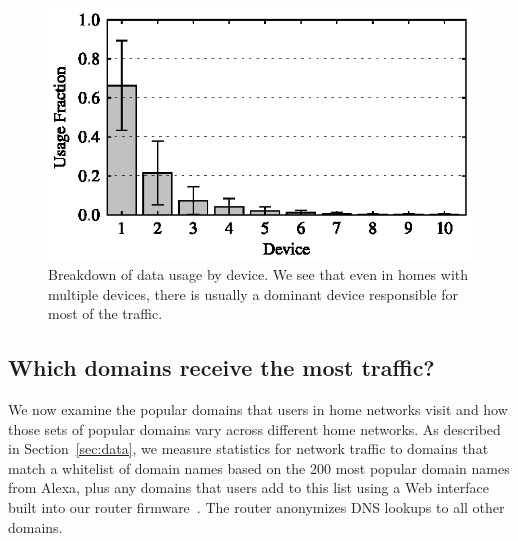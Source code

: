 \begin{figure}[t]
  \begin{minipage}{\linewidth}
  \includegraphics[width=0.98\linewidth]{figures/deviceUtil}
  \caption{Breakdown of data usage by device. We see that even
   in homes with multiple devices, there is usually a dominant
   device responsible for most of the traffic.}
  \label{fig:passive-device-frac}
  \end{minipage}
\end{figure}

\subsection{Which domains receive the most traffic?}\label{sec:popular-domains}

We now examine the popular domains that users in home networks visit
and how those sets of popular domains vary across different home
networks. As described in Section~\ref{sec:data}, we measure statistics
for network traffic to domains that match a whitelist of domain names
based on the 200 most popular domain names from Alexa, plus any domains
that users add to this list using a Web interface built into our router
firmware~\cite{www-alexa-us}. The router anonymizes DNS lookups to all other domains.


